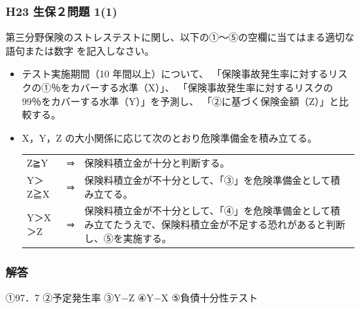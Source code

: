\documentclass[report,gutter=10mm,fore-edge=10mm,uplatex,dvipdfmx]{jlreq}
\begin{document}
\subsubsection{H23 生保２問題 1(1)}
第三分野保険のストレステストに関し、以下の①～⑤の空欄に当てはまる適切な語句または数字
を記入しなさい。
\begin{itemize}
 \item テスト実施期間（10 年間以上）について、
「保険事故発生率に対するリスクの①％をカバーする水準（X）」、
「保険事故発生率に対するリスクの 99％をカバーする水準（Y）」を予測し、
「②に基づく保険金額（Z）」と比較する。
 \item X，Y，Z の大小関係に応じて次のとおり危険準備金を積み立てる。
\begin{tabular}[b]{lcl}
 Z≧Y&⇒ & 保険料積立金が十分と判断する。\\
 Y＞Z≧X& ⇒&保険料積立金が不十分として、「③」を危険準備金として積み立てる。\\
Y＞X＞Z &⇒&保険料積立金が不十分として、「④」を危険準備金として積み立てたうえで、保険料積立金が不足する恐れがあると判断し、⑤を実施する。\\
\end{tabular}
\end{itemize}
\subsubsection{解答}
①97．7
②予定発生率
③Y−Z
④Y−X
⑤負債十分性テスト
\end{document}
